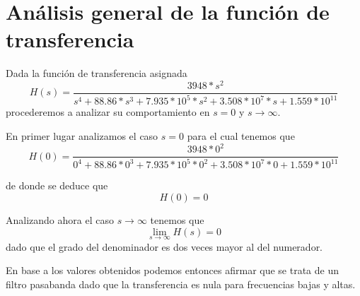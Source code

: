 \documentclass[11pt,a4paper]{report}
\author{Marcos}
\begin{document}

\section*{Análisis general de la función de transferencia}

Dada la función de transferencia asignada
\[H(s)=\frac{3948*s^2}{s^4+88.86*s^3+7.935*10^5*s^2+3.508*10^7*s+1.559*10^{11}}\]
procederemos a analizar su comportamiento en $s=0$ y $s\longrightarrow\infty$.

\bigskip
En primer lugar analizamos el caso $s=0$ para el cual tenemos que 
\[H(0) = \frac{3948*0^2}{0^4+88.86*0^3+7.935*10^5*0^2+3.508*10^7*0+1.559*10^{11}}\]

de donde se deduce que
\[H(0) = 0\]

Analizando ahora el caso $s\longrightarrow\infty$ tenemos que
\[\lim_{s \to \infty} H(s) = 0\]
dado que el grado del denominador es dos veces mayor al del numerador.

\bigskip
En base a los valores obtenidos podemos entonces afirmar que se trata de un
filtro pasabanda dado que la transferencia es nula para frecuencias bajas y altas.
\end{document}

